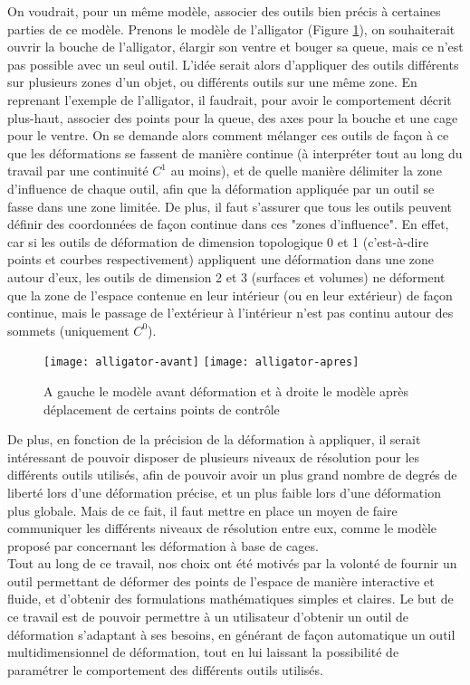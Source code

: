 On voudrait, pour un même modèle, associer des outils bien précis à
certaines parties de ce modèle. Prenons le modèle de l'alligator
(Figure \ref{INTall}), on souhaiterait ouvrir la bouche de
l'alligator, élargir son ventre et bouger sa queue, mais ce n'est pas
possible avec un seul outil. L'idée serait alors d'appliquer des
outils différents sur plusieurs zones d'un objet, ou différents outils
sur une même zone. En reprenant l'exemple de l'alligator, il faudrait,
pour avoir le comportement décrit plus-haut, associer des points pour
la queue, des axes pour la bouche et une cage pour le ventre. On se
demande alors comment mélanger ces outils de façon à ce que les
déformations se fassent de manière continue (à interpréter tout au
long du travail par une continuité $C^1$ au moins), et de quelle
manière délimiter la zone d'influence de chaque outil, afin que la
déformation appliquée par un outil se fasse dans une zone limitée. De
plus, il faut s'assurer que tous les outils peuvent définir des
coordonnées de façon continue dans ces "zones d'influence". En effet,
car si les outils de déformation de dimension topologique 0 et 1
(c'est-à-dire points et courbes respectivement) appliquent une
déformation dans une zone autour d'eux, les outils de dimension 2 et 3
(surfaces et volumes) ne déforment que la zone de l'espace contenue en
leur intérieur (ou en leur extérieur) de façon continue, mais le
passage de l'extérieur à l'intérieur n'est pas continu autour des
sommets (uniquement $C^0$).
\\


\begin{figure}[h]
  \texttt{[image: alligator-avant]}
  \texttt{[image: alligator-apres]}
  \caption{A gauche le modèle avant déformation et à droite le modèle
    après déplacement de certains points de contrôle}
  \label{INTall}
\end{figure}

De plus, en fonction de la précision de la déformation à appliquer, il
serait intéressant de pouvoir disposer de plusieurs niveaux de
résolution pour les différents outils utilisés, afin de pouvoir avoir
un plus grand nombre de degrés de liberté lors d'une déformation
précise, et un plus faible lors d'une déformation plus globale. Mais
de ce fait, il faut mettre en place un moyen de faire communiquer les
différents niveaux de résolution entre eux, comme le modèle proposé
par \cite{Hur12} concernant les déformation à base de cages.
\\

Tout au long de ce travail, nos choix ont été motivés par la volonté
de fournir un outil permettant de déformer des points de l'espace de
manière interactive et fluide, et d'obtenir des formulations
mathématiques simples et claires. Le but de ce travail est de pouvoir
permettre à un utilisateur d'obtenir un outil de déformation
s'adaptant à ses besoins, en générant de façon automatique un outil
multidimensionnel de déformation, tout en lui laissant la possibilité
de paramétrer le comportement des différents outils utilisés.


